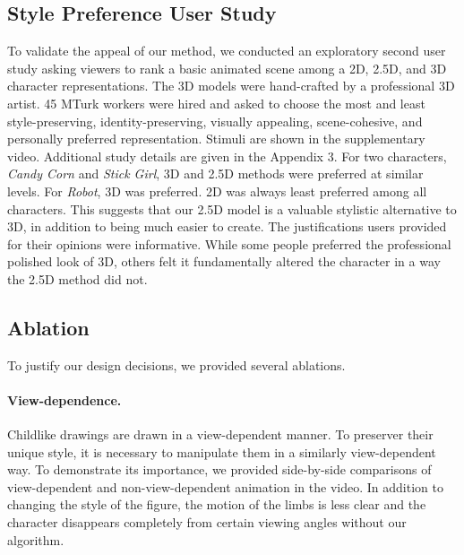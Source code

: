 



\subsection{Style Preference User Study}
\label{sec:style}
To validate the appeal of our method, we conducted an exploratory second user study asking viewers to rank a basic animated scene among a 2D, 2.5D, and 3D character representations.
The 3D models were hand-crafted by a professional 3D artist.
45 MTurk workers were hired and asked to choose the most and least style-preserving, identity-preserving, visually appealing, scene-cohesive, and personally preferred representation. Stimuli are shown in the supplementary video. Additional study details are given in the Appendix 3. 
For two characters,\textit{ Candy Corn} and \textit{Stick Girl}, 3D and 2.5D methods were preferred at similar levels.
For \textit{Robot}, 3D was preferred. 
2D was always least preferred among all characters.
This suggests that our 2.5D model is a valuable stylistic alternative to 3D, in addition to being much easier to create.
The justifications users provided for their opinions were informative. While some people preferred the professional polished look of 3D, others felt it fundamentally altered the character in a way the 2.5D method did not. 





\subsection{Ablation}
To justify our design decisions, we provided several ablations.

\paragraph{View-dependence.}
Childlike drawings are drawn in a view-dependent manner. To preserver their unique style, it is necessary to manipulate them in a similarly view-dependent way. To demonstrate its importance, we provided side-by-side comparisons of view-dependent and non-view-dependent animation in the video. In addition to changing the style of the figure, the motion of the limbs is less clear and the character disappears completely from certain viewing angles without our algorithm.






